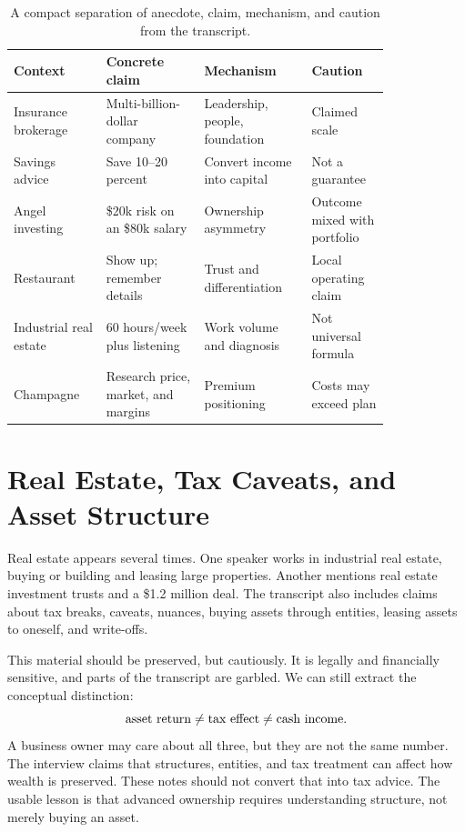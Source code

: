\begin{table}
\centering
\begingroup
\small
\setlength{\tabcolsep}{3pt}
\begin{tabular}{p{0.20\linewidth}p{0.22\linewidth}p{0.24\linewidth}p{0.16\linewidth}}
\hline
Context & Concrete claim & Mechanism & Caution\\
\hline
Insurance brokerage & Multi-billion-dollar company & Leadership, people, foundation & Claimed scale\\
Savings advice & Save 10--20 percent & Convert income into capital & Not a guarantee\\
Angel investing & \$20k risk on an \$80k salary & Ownership asymmetry & Outcome mixed with portfolio\\
Restaurant & Show up; remember details & Trust and differentiation & Local operating claim\\
Industrial real estate & 60 hours/week plus listening & Work volume and diagnosis & Not universal formula\\
Champagne & Research price, market, and margins & Premium positioning & Costs may exceed plan\\
\hline
\end{tabular}
\endgroup
\caption{A compact separation of anecdote, claim, mechanism, and caution from the transcript.}
\end{table}

\section{Real Estate, Tax Caveats, and Asset Structure}

Real estate appears several times. One speaker works in industrial real estate, buying or building and leasing large properties. Another mentions real estate investment trusts and a \$1.2 million deal. The transcript also includes claims about tax breaks, caveats, nuances, buying assets through entities, leasing assets to oneself, and write-offs.

This material should be preserved, but cautiously. It is legally and financially sensitive, and parts of the transcript are garbled. We can still extract the conceptual distinction:
\begin{equation}
\hbox{asset return}
\neq
\hbox{tax effect}
\neq
\hbox{cash income}.
\end{equation}
A business owner may care about all three, but they are not the same number. The interview claims that structures, entities, and tax treatment can affect how wealth is preserved. These notes should not convert that into tax advice. The usable lesson is that advanced ownership requires understanding structure, not merely buying an asset.


